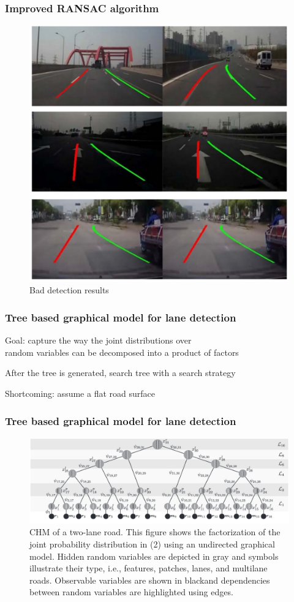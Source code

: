 \documentclass[t]{beamer}
\begin{document}
\frame
{
	\frametitle{Improved RANSAC algorithm}
	\begin{figure}[ht]
	\centering
   	\includegraphics[scale = 0.3]{pictures/bad_detections.pdf}
	\caption{Bad detection results}
	\label{fig5}
	\end{figure}
}


\frame
{
	\frametitle{Tree based graphical model for lane detection}
	\itemize
	{
		\item Goal:  capture the way the joint distributions over \\random variables can be decomposed into a product of factors
		\item After the tree is generated, search tree with a search strategy
		\item Shortcoming: assume a flat road surface
	}

}

\frame
{
	\frametitle{Tree based graphical model for lane detection}


	\begin{figure}
	\centering
    \includegraphics[scale = 0.25]{pictures/tree.pdf}
	\caption{CHM of a two-lane road. This figure shows the factorization of the joint probability distribution in (2) using an undirected graphical model. Hidden random variables are depicted in gray and symbols illustrate their type, i.e., features, patches, lanes, and multilane roads. Observable variables are shown in blackand dependencies between random variables are highlighted using edges.}
	\label{fig10}
	\end{figure}

}
\end{document}
